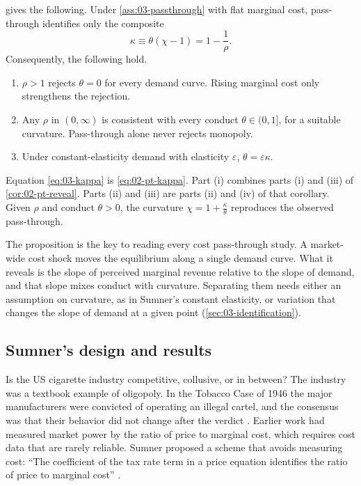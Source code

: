 \begin{proposition}\label{prop:03-passthrough-id}
 gives the following. Under \cref{ass:03-passthrough} with flat marginal cost, pass-through
identifies only the composite
\begin{equation}\label{eq:03-kappa}
\kappa \equiv \theta(\chi - 1) = 1 - \frac{1}{\rho}.
\end{equation}
Consequently, the following hold.
\begin{enumerate}[label=(\roman*)]
\item $\rho > 1$ rejects $\theta = 0$ for every demand curve. Rising marginal cost only strengthens the rejection.
\item Any $\rho$ in $(0, \infty)$ is consistent with every conduct $\theta \in (0, 1]$, for a suitable curvature.
  Pass-through alone never rejects monopoly.
\item Under constant-elasticity demand with elasticity $\varepsilon$, $\theta = \varepsilon\kappa$.
\end{enumerate}
\end{proposition}

Equation \eqref{eq:03-kappa} is \eqref{eq:02-pt-kappa}. Part (i) combines parts (i) and (iii) of
\cref{cor:02-pt-reveal}. Parts (ii) and (iii) are parts (ii) and (iv) of that corollary. Given $\rho$ and conduct
$\theta > 0$, the curvature $\chi = 1 + \frac{\kappa}{\theta}$ reproduces the observed pass-through.

The proposition is the key to reading every cost pass-through study. A market-wide cost shock moves the equilibrium
along a single demand curve. What it reveals is the slope of perceived marginal revenue relative to the slope of demand,
and that slope mixes conduct with curvature. Separating them needs either an assumption on curvature, as in Sumner's
constant elasticity, or variation that changes the slope of demand at a given point (\cref{sec:03-identification}).

\subsection{Sumner's design and results}\label{sec:03-sumner-design}

Is the US cigarette industry competitive, collusive, or in between? The industry was a textbook example of oligopoly.
In the Tobacco Case of 1946 the major manufacturers were convicted of operating an illegal cartel, and the consensus
was that their behavior did not change after the verdict \citep[p.~1010]{Sumner1981}. Earlier work had measured market
power by the ratio of price to marginal cost, which requires cost data that are rarely reliable. Sumner proposed a
scheme that avoids measuring cost: ``The coefficient of the tax rate term in a price equation identifies the ratio of
price to marginal cost'' \citep[p.~1010]{Sumner1981}.

